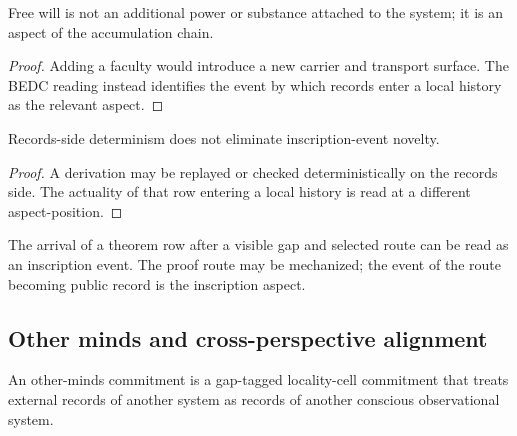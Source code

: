 \begin{theorem}
\label{thm:philosophy-free-will-not-faculty}
Free will is not an additional power or substance attached to the
system; it is an aspect of the accumulation chain.
\end{theorem}
\begin{proof}
Adding a faculty would introduce a new carrier and transport surface.
The BEDC reading instead identifies the event by which records enter a
local history as the relevant aspect.
\end{proof}

\begin{corollary}
\label{cor:philosophy-freedom-compatible-determinism}
Records-side determinism does not eliminate inscription-event novelty.
\end{corollary}
\begin{proof}
A derivation may be replayed or checked deterministically on the
records side. The actuality of that row entering a local history is
read at a different aspect-position.
\end{proof}

\begin{example}
\label{ex:philosophy-mathematical-creation-inscription}
The arrival of a theorem row after a visible gap and selected route can
be read as an inscription event. The proof route may be mechanized; the
event of the route becoming public record is the inscription aspect.
\end{example}

\subsection{Other minds and cross-perspective alignment}
\label{subsec:philosophy-other-minds-cross-perspective}

\begin{definition}
\label{def:philosophy-other-minds-commitment}
An other-minds commitment is a gap-tagged locality-cell commitment that
treats external records of another system as records of another
conscious observational system.
\end{definition}

